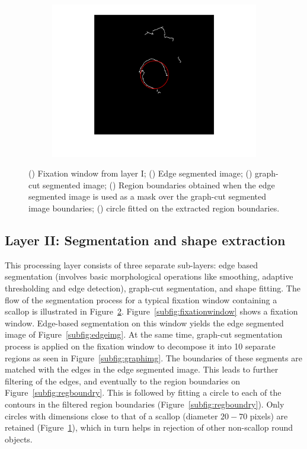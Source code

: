 \documentclass {udthesis}
\begin{document}
\begin{figure}
\begin{subfigure}[]{0.17\textwidth}
      \includegraphics[width=\textwidth,natwidth=810,natheight=813]{regcircle.pdf}         
      \caption{}
      \label{subfig:regcircle}
  \end{subfigure}
\caption[Segmentation layer process flow]{() Fixation window from layer I; () Edge segmented image; () graph-cut segmented image; () Region boundaries obtained when the edge segmented image is used as a mask over the graph-cut segmented image boundaries; () circle fitted on the extracted region boundaries.
}
\label{fig:segmentation_levels}
\end{figure}


\subsection{Layer II: Segmentation and shape extraction}
\label{subsec:layer2}

This processing layer consists of
three separate sub-layers: edge based segmentation (involves basic morphological 
operations like smoothing, adaptive thresholding and edge detection), graph-cut 
segmentation, and shape fitting. 
The flow of the segmentation process for a typical fixation window containing a scallop is illustrated in Figure~\ref{fig:segmentation_levels}. 
Figure~\ref{subfig:fixationwindow} shows a fixation window.
Edge-based segmentation on this window yields the edge segmented image of Figure~\ref{subfig:edgeimg}.
At the same time, graph-cut segmentation process \cite{shi} is applied on the 
fixation window to decompose it into 10 separate regions
as seen in Figure~\ref{subfig:graphimg}. The boundaries of these
segments are matched with the edges in the edge segmented image.
This leads to further filtering of the edges, and eventually to the region boundaries
on Figure~\ref{subfig:regboundry}.
This is followed by fitting a circle to 
each of the contours in the filtered region boundaries (Figure~\ref{subfig:regboundry}). 
Only circles with dimensions close to that of a scallop (diameter $20 - 70$ pixels) 
are retained (Figure~\ref{subfig:regcircle}), which in turn helps in rejection of other 
non-scallop round objects.
\end{document}
